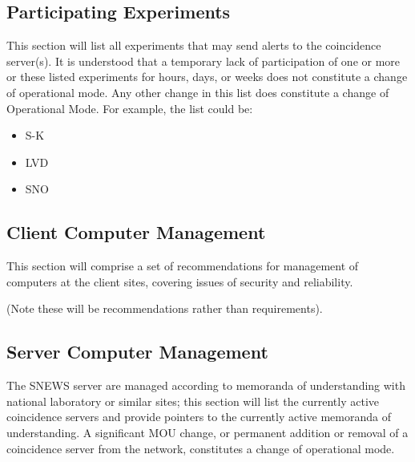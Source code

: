 \documentclass{article}
\begin{document}
\subsection{Participating Experiments}

This section will list all experiments that may send alerts to the
coincidence server(s).  It is understood that a temporary lack of
participation of one or more or these listed experiments for hours,
days, or weeks does not constitute a change of operational mode.  Any
other change in this list does constitute a change of Operational
Mode.  For example, the list could be:

\begin{itemize}
\item S-K
\item LVD
\item SNO
\end{itemize}

\subsection{Client Computer Management}

This section will comprise a set of recommendations for
management of computers at the client sites, covering issues
of security and reliability.

(Note these will be recommendations rather than requirements).

\subsection{Server Computer Management}

The SNEWS server are managed according to memoranda
of understanding with national laboratory or similar sites;
this section will list the currently active coincidence
servers and provide pointers to the currently active memoranda
of understanding.  A significant MOU change, or permanent addition
or removal of a coincidence server from the network,  
constitutes a change of operational mode.

\end{document}
